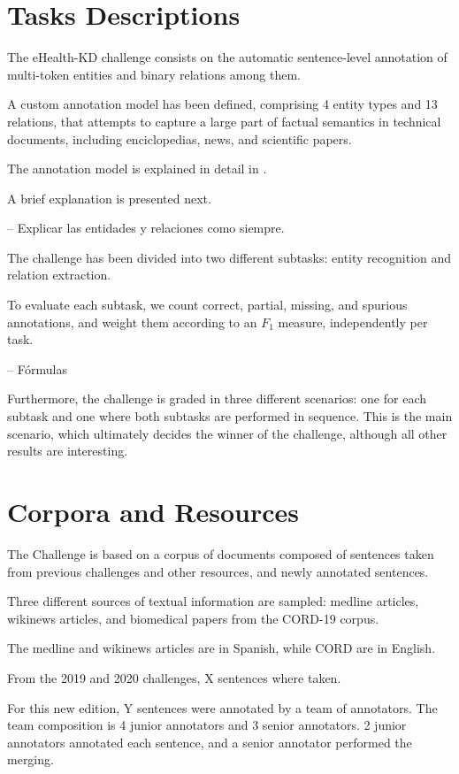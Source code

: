 \documentclass[a4paper,11pt,twocolumn,twoside]{article}
\begin{document}
\section{Tasks Descriptions}\label{sec:task}

The eHealth-KD challenge consists on the automatic sentence-level annotation
of multi-token entities and binary relations among them.

A custom annotation model has been defined, comprising 4 entity types and 13 relations,
that attempts to capture a large part of factual semantics in technical documents,
including enciclopedias, news, and scientific papers.

The annotation model is explained in detail in .

A brief explanation is presented next.

-- Explicar las entidades y relaciones como siempre.

The challenge has been divided into two different subtasks:
entity recognition and relation extraction.

To evaluate each subtask, we count correct, partial, missing, and spurious
annotations, and weight them according to an $F_1$ measure, independently per task.

-- Fórmulas

Furthermore, the challenge is graded in three different scenarios:
one for each subtask and one where both subtasks are performed in sequence.
This is the main scenario, which ultimately decides the winner of the challenge,
although all other results are interesting.

\section{Corpora and Resources}\label{sec:resources}

The Challenge is based on a corpus of documents composed of
sentences taken from previous challenges and other resources,
and newly annotated sentences.

Three different sources of textual information are sampled: medline articles,
wikinews articles, and biomedical papers from the CORD-19 corpus.

The medline and wikinews articles are in Spanish, while CORD are in English.

From the 2019 and 2020 challenges, X sentences where taken.

For this new edition, Y sentences were annotated by a team of annotators.
The team composition is 4 junior annotators and 3 senior annotators.
2 junior annotators annotated each sentence, and a senior annotator performed the merging.
\end{document}
